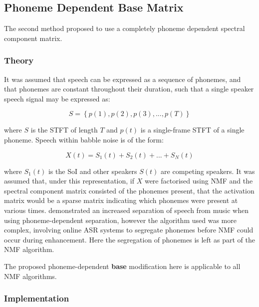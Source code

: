 \subsection{\label{sub:Phoneme-Base}Phoneme Dependent Base Matrix}

The second method proposed to use a completely phoneme dependent spectral
component matrix.


\subsubsection*{Theory}

It was assumed that speech can be expressed as a sequence of phonemes,
and that phonemes are constant throughout their duration, such that
a single speaker speech signal may be expressed as:

\[
S=\left\{ p\left(1\right),p\left(2\right),p\left(3\right),...,p\left(T\right)\right\} 
\]



where $S$ is the \ac{STFT} of length $T$ and $p\left(t\right)$
is a single-frame \ac{STFT} of a single phoneme. Speech within babble
noise is of the form:

\[
X\left(t\right)=S_{1}\left(t\right)+S_{2}\left(t\right)+...+S_{N}\left(t\right)
\]


where $S_{1}\left(t\right)$ is the \ac{SoI} and other speakers $S\left(t\right)$
are competing speakers. It was assumed that, under this representation,
if $X$ were factorised using \ac{NMF} and the spectral component
matrix consisted of the phonemes present, that the activation matrix
would be a sparse matrix indicating which phonemes were present at
various times. \citet{Raj2011} demonstrated an increased separation
of speech from music when using phoneme-dependent separation, however
the algorithm used was more complex, involving online \ac{ASR} systems
to segregate phonemes before \ac{NMF} could occur during enhancement.
Here the segregation of phonemes is left as part of the \ac{NMF}
algorithm.

The proposed phoneme-dependent\textbf{ base} modification here is
applicable to all \ac{NMF} algorithms.


\subsubsection*{Implementation}

